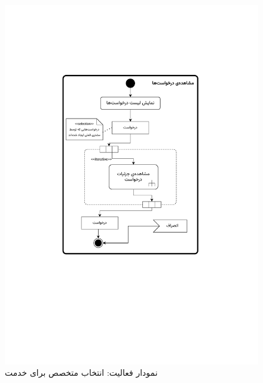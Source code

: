 \begin{figure}
	\centering
	\includegraphics[scale=0.8, page=3]{figs/OOD-activity11-20.pdf}
	\caption{نمودار فعالیت: انتخاب متخصص برای خدمت}
\end{figure}
\FloatBarrier
\newpage

